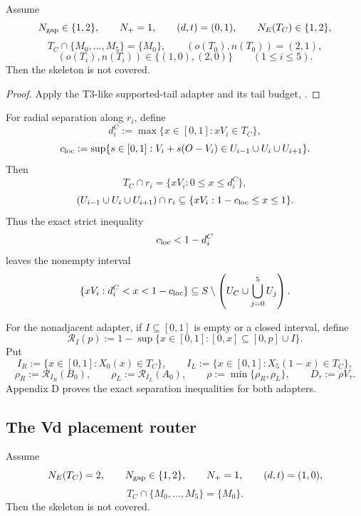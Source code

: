 \begin{proposition}
\label{prop:new-one-t3-terminal}
Assume
\[
 N_{\rm gap}\in\{1,2\},
 \qquad
 N_+=1,
 \qquad
 (d,t)=(0,1),
 \qquad
 N_E(T_C)\in\{1,2\},
\]
\[
 T_C\cap\{M_0,\ldots,M_5\}=\{M_0\},
 \qquad
 (o(T_0),n(T_0))=(2,1),
\]
\[
 (o(T_i),n(T_i))\in\{(1,0),(2,0)\}
 \qquad(1\le i\le5).
\]
Then the skeleton is not covered.
\end{proposition}



\begin{proof}
Apply the T3-like supported-tail adapter and its tail budget,
.
\end{proof}


\FloatBarrier

For radial separation along \(r_i\), define
\[
 d_i^C:=\max\{x\in[0,1]:xV_i\in T_C\},
\]
\[
 c_{\rm loc}:=
 \sup\{s\in[0,1]:
 V_i+s(O-V_i)\in U_{i-1}\cup U_i\cup U_{i+1}\}.
\]
Then
\[
 T_C\cap r_i=\{xV_i:0\le x\le d_i^C\},
\]
\[
 (U_{i-1}\cup U_i\cup U_{i+1})\cap r_i
 \subseteq\{xV_i:1-c_{\rm loc}\le x\le1\}.
\]
Thus the exact strict inequality
\[
 c_{\rm loc}<1-d_i^C
\]
leaves the nonempty interval
\[
 \{xV_i:d_i^C<x<1-c_{\rm loc}\}
 \subseteq S\setminus
 \left(U_C\cup\bigcup_{j=0}^5U_j\right).
\]

For the nonadjacent adapter, if \(I\subseteq[0,1]\) is empty or a closed
interval, define
\[
 \mathcal R_I(p):=
 1-\sup\{x\in[0,1]:[0,x]\subseteq[0,p]\cup I\}.
\]
Put
\[
 I_R:=\{x\in[0,1]:X_0(x)\in T_C\},
 \qquad
 I_L:=\{x\in[0,1]:X_5(1-x)\in T_C\},
\]
\[
 \rho_R:=\mathcal R_{I_R}(B_0),
 \qquad
 \rho_L:=\mathcal R_{I_L}(A_0),
 \qquad
 \rho:=\min\{\rho_R,\rho_L\},
 \qquad
 D_\tau:=\rho V_\tau.
\]
Appendix D proves the exact separation inequalities for both adapters.

\subsection{The Vd placement router}

\begin{proposition}
\label{prop:new-one-vd-assembly}
Assume
\[
 N_E(T_C)=2,
 \qquad
 N_{\rm gap}\in\{1,2\},
 \qquad
 N_+=1,
 \qquad
 (d,t)=(1,0),
\]
\[
 T_C\cap\{M_0,\ldots,M_5\}=\{M_0\}.
\]
Then the skeleton is not covered.
\end{proposition}

